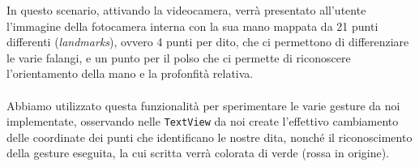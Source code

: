 \begin{multicols}{2}
\begin{multicolfigure}
    \end{multicolfigure}
\end{multicols}

\noindent In questo scenario, attivando la videocamera, verrà presentato all'utente l'immagine della fotocamera interna con la sua mano mappata da 21 punti 
differenti (\textit{landmarks}), ovvero 4 punti per dito, che ci permettono di differenziare le varie falangi, e un punto per 
il polso che ci permette di riconoscere l'orientamento della mano e la profonfità relativa.\\
\\
\noindent Abbiamo utilizzato questa funzionalità per sperimentare le varie gesture da noi implementate, osservando nelle \texttt{TextView} da noi create
l'effettivo cambiamento delle coordinate dei punti che identificano le nostre dita, nonché il 
riconoscimento della gesture eseguita, la cui scritta verrà colorata di verde (rossa in origine).


\newpage

